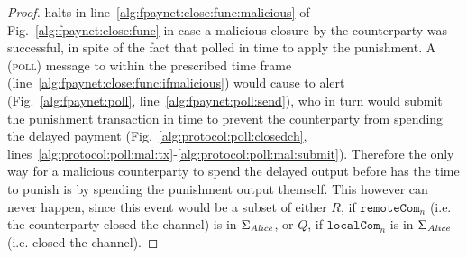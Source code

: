 \begin{proof}
  \fpaynet{} halts in line~\ref{alg:fpaynet:close:func:malicious} of
  Fig.~\ref{alg:fpaynet:close:func} in case a malicious closure by the
  counterparty was successful, in spite of the fact that \alice{} polled in time
  to apply the punishment. A (\textsc{poll}) message to \alice{} within the
  prescribed time frame (line~\ref{alg:fpaynet:close:func:ifmalicious}) would
  cause \fpaynet{} to alert \simulator{} (Fig.~\ref{alg:fpaynet:poll},
  line~\ref{alg:fpaynet:poll:send}), who in turn would submit the punishment
  transaction in time to prevent the counterparty from spending the delayed
  payment (Fig.~\ref{alg:protocol:poll:closedch},
  lines~\ref{alg:protocol:poll:mal:tx}-\ref{alg:protocol:poll:mal:submit}).
  Therefore the only way for a malicious counterparty to spend the delayed
  output before \alice{} has the time to punish is by spending the punishment
  output themself. This however can never happen, since this event would be a
  subset of either $R$, if $\mathtt{remoteCom}_n$ (i.e. the counterparty closed
  the channel) is in $\Sigma_{\mathit{Alice}}$, or $Q$, if $\mathtt{localCom}_n$ is in
  $\Sigma_{\mathit{Alice}}$ (i.e. \alice{} closed the channel).


\end{proof}
